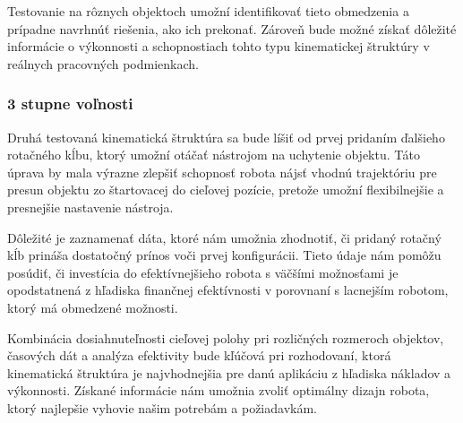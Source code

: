 Testovanie na rôznych objektoch umožní identifikovať tieto obmedzenia a prípadne navrhnúť riešenia, ako ich prekonať. Zároveň bude možné získať dôležité informácie o výkonnosti a schopnostiach tohto typu kinematickej štruktúry v reálnych pracovných podmienkach.


\subsubsection{3 stupne voľnosti}
\label{kap:1.2.2}


Druhá testovaná kinematická štruktúra sa bude líšiť od prvej pridaním ďalšieho rotačného kĺbu, ktorý umožní otáčať nástrojom na uchytenie objektu. Táto úprava by mala výrazne zlepšiť schopnosť robota nájsť vhodnú trajektóriu pre presun objektu zo štartovacej do cieľovej pozície, pretože umožní flexibilnejšie a presnejšie nastavenie nástroja.

Dôležité je zaznamenať dáta, ktoré nám umožnia zhodnotiť, či pridaný rotačný kĺb prináša dostatočný prínos voči prvej konfigurácii. Tieto údaje nám pomôžu posúdiť, či investícia do efektívnejšieho robota s väčšími možnosťami je opodstatnená z hľadiska finančnej efektívnosti v porovnaní s lacnejším robotom, ktorý má obmedzené možnosti.

Kombinácia dosiahnuteľnosti cieľovej polohy pri rozličných rozmeroch objektov, časových dát a analýza efektivity bude kľúčová pri rozhodovaní, ktorá kinematická štruktúra je najvhodnejšia pre danú aplikáciu z hľadiska nákladov a výkonnosti. Získané informácie nám umožnia zvoliť optimálny dizajn robota, ktorý najlepšie vyhovie našim potrebám a požiadavkám.

